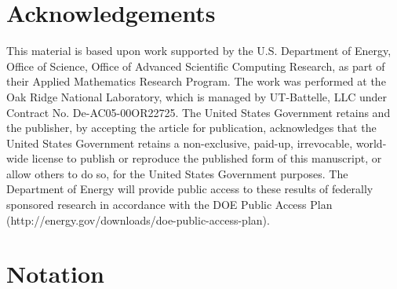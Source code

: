 \documentclass[preprint,runningheads]{svjour3}
\begin{document}
\section{Acknowledgements}
This material is based upon work supported by the U.S. Department of Energy, Office of Science, Office of Advanced Scientific Computing Research, as part of their Applied Mathematics Research Program. The work was performed at the Oak Ridge National Laboratory, which is managed by UT-Battelle, LLC under Contract No. De-AC05-00OR22725. The United States Government retains and the publisher, by accepting the article for publication, acknowledges that the United States Government retains a non-exclusive, paid-up, irrevocable, world-wide license to publish or reproduce the published form of this manuscript, or allow others to do so, for the United States Government purposes. The Department of Energy will provide public access to these results of federally sponsored research in accordance with the DOE Public Access Plan (http://energy.gov/downloads/doe-public-access-plan).


 	
	
	 

\appendix
\newpage
\section{Notation}\label{tab:notation}
\end{document}
